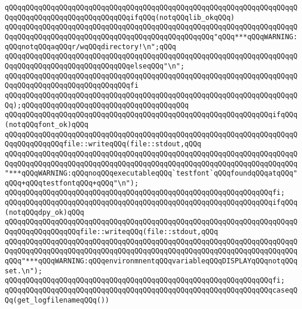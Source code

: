 \verb|qQQqqQQqqQQqqQQqqQQqqQQqqQQqqQQqqQQqqQQqqQQqqQQqqQQqqQQqqQQqqQQqqQQqqQQqqQQqqQQqqQQqqQQqqQQqqQQqqQQqifqQQq(notqQQqlib_okqQQq)|\newline
\verb|qQQqqQQqqQQqqQQqqQQqqQQqqQQqqQQqqQQqqQQqqQQqqQQqqQQqqQQqqQQqqQQqqQQqqQQqqQQqqQQqqQQqqQQqqQQqqQQqqQQqqQQqqQQqqQQqqQQqqQQq"qQQq***qQQqWARNING:qQQqnotqQQqaqQQqr/wqQQqdirectory!\n";qQQq|\newline
\verb|qQQqqQQqqQQqqQQqqQQqqQQqqQQqqQQqqQQqqQQqqQQqqQQqqQQqqQQqqQQqqQQqqQQqqQQqqQQqqQQqqQQqqQQqqQQqqQQqqQQqelseqQQq"\n";|\newline
\verb|qQQqqQQqqQQqqQQqqQQqqQQqqQQqqQQqqQQqqQQqqQQqqQQqqQQqqQQqqQQqqQQqqQQqqQQqqQQqqQQqqQQqqQQqqQQqqQQqqQQqfi|\newline
\verb|qQQqqQQqqQQqqQQqqQQqqQQqqQQqqQQqqQQqqQQqqQQqqQQqqQQqqQQqqQQqqQQqqQQqqQQq);qQQqqQQqqQQqqQQqqQQqqQQqqQQqqQQqqQQqqQQq|\newline
\newline
\verb|qQQqqQQqqQQqqQQqqQQqqQQqqQQqqQQqqQQqqQQqqQQqqQQqqQQqqQQqqQQqqQQqifqQQq(notqQQqfont_ok)qQQq|\newline
\verb|qQQqqQQqqQQqqQQqqQQqqQQqqQQqqQQqqQQqqQQqqQQqqQQqqQQqqQQqqQQqqQQqqQQqqQQqqQQqqQQqqQQqfile::writeqQQq(file::stdout,qQQq|\newline
\verb|qQQqqQQqqQQqqQQqqQQqqQQqqQQqqQQqqQQqqQQqqQQqqQQqqQQqqQQqqQQqqQQqqQQqqQQqqQQqqQQqqQQqqQQqqQQqqQQqqQQqqQQqqQQqqQQqqQQqqQQqqQQqqQQqqQQqqQQqqQQq"***qQQqWARNING:qQQqnoqQQqexecutableqQQq`testfont`qQQqfoundqQQqatqQQq"qQQq+qQQqtestfontqQQq+qQQq"\n");|\newline
\verb|qQQqqQQqqQQqqQQqqQQqqQQqqQQqqQQqqQQqqQQqqQQqqQQqqQQqqQQqqQQqqQQqfi;|\newline
\newline
\verb|qQQqqQQqqQQqqQQqqQQqqQQqqQQqqQQqqQQqqQQqqQQqqQQqqQQqqQQqqQQqqQQqifqQQq(notqQQqdpy_ok)qQQq|\newline
\verb|qQQqqQQqqQQqqQQqqQQqqQQqqQQqqQQqqQQqqQQqqQQqqQQqqQQqqQQqqQQqqQQqqQQqqQQqqQQqqQQqqQQqqQQqfile::writeqQQq(file::stdout,qQQq|\newline
\verb|qQQqqQQqqQQqqQQqqQQqqQQqqQQqqQQqqQQqqQQqqQQqqQQqqQQqqQQqqQQqqQQqqQQqqQQqqQQqqQQqqQQqqQQqqQQqqQQqqQQqqQQqqQQqqQQqqQQqqQQqqQQqqQQqqQQqqQQqqQQqqQQq"***qQQqWARNING:qQQqenvironmnentqQQqvariableqQQqDISPLAYqQQqnotqQQqset.\n");|\newline
\verb|qQQqqQQqqQQqqQQqqQQqqQQqqQQqqQQqqQQqqQQqqQQqqQQqqQQqqQQqqQQqqQQqfi;|\newline
\newline
\verb|qQQqqQQqqQQqqQQqqQQqqQQqqQQqqQQqqQQqqQQqqQQqqQQqqQQqqQQqqQQqqQQqcaseqQQq(get_logfilenameqQQq())|\newline
